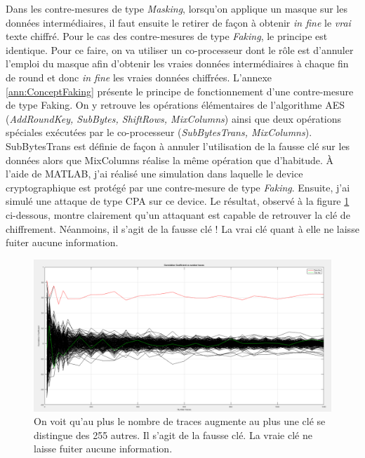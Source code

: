 \documentclass[10pt, oneside, a4paper]{article}
\begin{document}
Dans les contre-mesures de type \textit{Masking}, lorsqu'on applique un masque sur les données intermédiaires, il faut ensuite le retirer de façon à obtenir \textit{in fine} le \textit{vrai} texte chiffré. Pour le cas des contre-mesures de type \textit{Faking}, le principe est identique. Pour ce faire, on va utiliser un co-processeur dont le rôle est d'annuler l'emploi du masque afin d'obtenir les vraies données intermédiaires à chaque fin de round et donc \textit{in fine} les vraies données chiffrées. L'annexe \ref{ann:ConceptFaking} présente le principe de fonctionnement d'une contre-mesure de type Faking. On y retrouve les opérations élémentaires de l'algorithme AES (\textit{AddRoundKey, SubBytes, ShiftRows, MixColumns}) ainsi que deux opérations spéciales exécutées par le co-processeur (\textit{SubBytesTrans, MixColumns}). SubBytesTrans est définie de façon à annuler l'utilisation de la fausse clé sur les données alors que MixColumns réalise la même opération que d'habitude. À l'aide de MATLAB, j'ai réalisé une simulation dans laquelle le device cryptographique est protégé par une contre-mesure de type \textit{Faking}. Ensuite, j'ai simulé une attaque de type CPA sur ce device. Le résultat, observé à la figure \ref{fig:faking} ci-dessous, montre clairement qu'un attaquant est capable de retrouver la clé de chiffrement. Néanmoins, il s'agit de la fausse clé ! La vrai clé quant à elle ne laisse fuiter aucune information.

\begin{figure}[htbp]
    \centering
    \includegraphics[width=\linewidth]{image/faking}
    \caption{On voit qu'au plus le nombre de traces augmente au plus une clé se distingue des 255 autres. Il s'agit de la fausse clé. La vraie clé ne laisse fuiter aucune information.}
    \label{fig:faking} 
\end{figure}

\newpage
\end{document}

